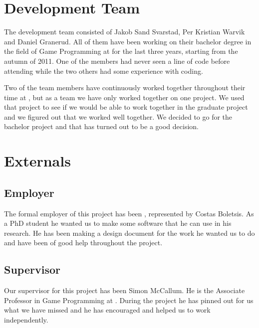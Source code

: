 \section{Development Team}
The development team consisted of Jakob Sand Svarstad, Per Kristian Warvik and Daniel Granerud.
All of them have been working on their bachelor degree in the field of Game Programming at \GUC{} for the last three years, starting from the autumn of 2011. One of the members had never seen a line of code before attending \GUC{} while the two others had some experience with coding.

Two of the team members have continuously worked together throughout their time at \GUC{}, but as a team we have only worked together on one project. We used that project to see if we would be able to work together in the graduate project and we figured out that we worked well together. We decided to go for the bachelor project and that has turned out to be a good decision.

\section{Externals}

\subsection{Employer}
The formal employer of this project has been \GUC{}, represented by Costas Boletsis. As a PhD student he wanted us to make some software that he can use in his research. He has been making a design document for the work he wanted us to do and have been of good help throughout the project.

\subsection{Supervisor}
Our supervisor for this project has been Simon McCallum. He is the Associate Professor in Game Programming at \GUC{}. During the project he has pinned out for us what we have missed and he has encouraged and helped us to work independently.
